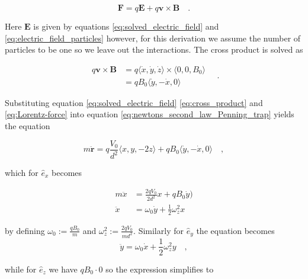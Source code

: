 \documentclass[../main_proj3.tex]{subfiles}
\begin{document}
\begin{equation}
    \label{eq:Lorentz-force}
    \mathbf{F} = q\mathbf{E} + q \mathbf{v} \times \mathbf{B} \quad .
\end{equation}

Here $\mathbf{E}$ is given by equations \eqref{eq:solved_electric_field} and \eqref{eq:electric_field_particles} however, for this derivation we assume the number of particles to be one so we leave out the interactions. The cross product is solved as 

\begin{equation}
\label{eq:cross_product}
\begin{split}
q \mathbf{v} \times \mathbf{B} & =  q \bigl\langle 
\dot{x}, \dot{y}, \dot{z}
\bigr\rangle \times \bigl\langle 
0, 0, B_0
\bigr\rangle \\
&= qB_0 \bigl\langle
\dot{y}, -\dot{x}, 0
\bigr\rangle 
\end{split} \quad .
\end{equation}

Substituting equation \eqref{eq:solved_electric_field} \eqref{eq:cross_product} and \eqref{eq:Lorentz-force} into equation \eqref{eq:newtons_second_law_Penning_trap} yields the equation 

\begin{equation*}
m \mathbf{\ddot{r}} = q \frac{V_0}{d^{2}} 
\bigl\langle 
x, y, -2z
\bigr\rangle + qB_0 \bigl\langle
\dot{y}, -\dot{x}, 0
\bigr\rangle  \quad,
\end{equation*}

which for $\hat{e}_x$ becomes

\begin{equation}
\label{eq:eq_of_motion_x}
\begin{split}
m \ddot{x} & = \frac{2qV_0}{2d^{2}}x + qB_0 \dot{y}) \\
\ddot{x}  &= \omega_0 \dot{y} + \frac{1}{2} \omega_z^{2} x
\end{split}
\end{equation}

by defining $\omega_0 :=\frac{qB_0}{m}$ and $\omega_z^{2} := \frac{2qV_0}{md^{2}}$. Similarly for $\hat e_y$ the equation becomes 
\begin{equation}
\label{eq:eq_of_motion_y}
\ddot{y}  = \omega_0 \dot{x} + \frac{1}{2} \omega_z^{2} y \quad ,
\end{equation}

while for $\hat e_z$ we have $qB_0 \cdot 0$ so the expression simplifies to 
\end{document}
